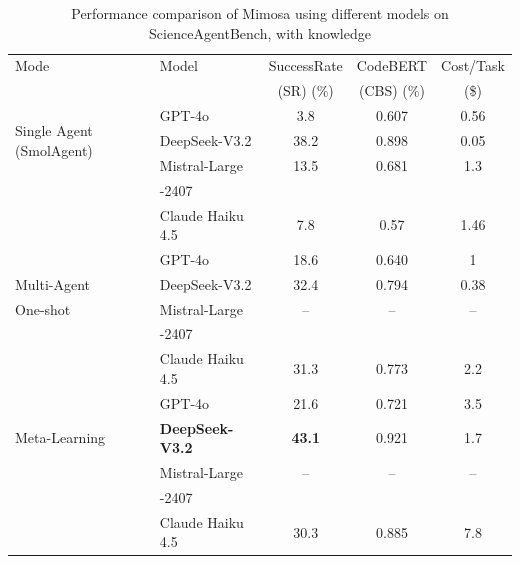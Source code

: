 \documentclass{article}
\begin{document}
\begin{table}[h]
  \caption{Performance comparison of Mimosa using different models on ScienceAgentBench, with knowledge}
  \label{tab:main-results}
  \centering
  \begin{tabular}{llccc}
    \toprule
    Mode & Model & SuccessRate & CodeBERT& Cost/Task\\
    &&(SR) (\%)& (CBS) (\%) & (\$) \\
    \midrule
    \multirow{3}{*}{Single Agent (SmolAgent)} 
      & GPT-4o & 3.8 & 0.607 & 0.56 \\
      & DeepSeek-V3.2 & 38.2 & 0.898 & 0.05 \\
      & Mistral-Large & 13.5 & 0.681 & 1.3 \\
      &-2407&&&\\
      & Claude Haiku 4.5 & 7.8 & 0.57 & 1.46 \\
    \midrule
      & GPT-4o & 18.6 & 0.640 & 1 \\
      Multi-Agent& DeepSeek-V3.2 & 32.4 & 0.794 & 0.38 \\
      One-shot& Mistral-Large & -- & -- & -- \\
      &-2407&&&\\
      & Claude Haiku 4.5 & 31.3 & 0.773 & 2.2 \\
    \midrule
    \multirow{3}{*}{Meta-Learning}
      & GPT-4o & 21.6 & 0.721 & 3.5 \\
      & \textbf{DeepSeek-V3.2} & \textbf{43.1} & 0.921 & 1.7 \\
      & Mistral-Large & -- & -- & -- \\
      &-2407&&&\\
      & Claude Haiku 4.5 & 30.3 & 0.885 & 7.8 \\
    \bottomrule
  \end{tabular}
\end{table}
\end{document}

